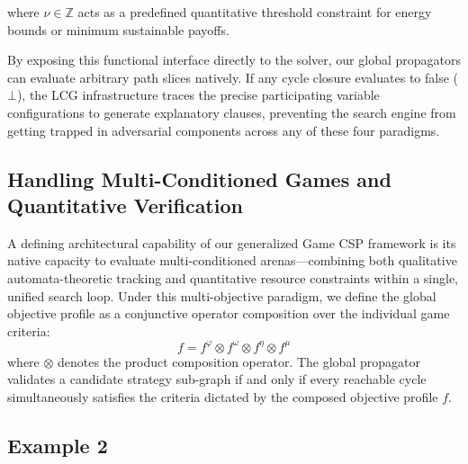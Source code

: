 \documentclass[a4paper,fleqn]{cas-sc}
\begin{document}
\noindent where $\nu \in \mathbb{Z}$ acts as a predefined quantitative threshold constraint for energy bounds or minimum sustainable payoffs. 

By exposing this functional interface directly to the solver, our global propagators \nooppc   can evaluate arbitrary path slices natively. If any cycle closure evaluates to false ($\bot$), the LCG infrastructure traces the precise participating variable configurations to generate explanatory clauses, preventing the search engine from getting trapped in adversarial components across any of these four paradigms.


\subsection{Handling Multi-Conditioned Games and Quantitative Verification}\label{sec:multi_conditioned}

A defining architectural capability of our generalized Game CSP framework is its native capacity to evaluate multi-conditioned arenas—combining both qualitative automata-theoretic tracking and quantitative resource constraints within a single, unified search loop. Under this multi-objective paradigm, we define the global objective profile as a conjunctive operator composition over the individual game criteria:
\[
f = f^{\mathcal{\varphi}} \otimes f^{\omega} \otimes f^{\eta} \otimes f^{\mu} 
\]
where $\otimes$ denotes the product composition operator. The global propagator validates a candidate strategy sub-graph if and only if every reachable cycle simultaneously satisfies the criteria dictated by the composed objective profile $f$.

\subsection*{Example 2}
\label{sec:example2}
\end{document}
